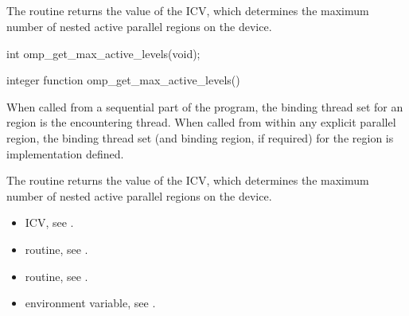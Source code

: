 \subsection{}
\label{subsec:omp_get_max_active_levels}
\summary
The  routine returns the value of the
 ICV, which determines the maximum number of nested active parallel regions
on the device.

\format
\begin{ccppspecific}
\begin{ompcFunction}
int omp_get_max_active_levels(void);
\end{ompcFunction}
\end{ccppspecific}

\begin{fortranspecific}
\begin{ompfFunction}
integer function omp_get_max_active_levels()
\end{ompfFunction}
\end{fortranspecific}

\binding
When called from a sequential part of the program, the binding thread set for an
 region is the encountering thread. When called
from within any explicit parallel region, the binding thread set (and binding region, if
required) for the  region is implementation defined.

\effect
The  routine returns the value of the  ICV,
which determines the maximum number of nested active parallel regions
on the device.

\crossreferences
\begin{itemize}
\item {} ICV, see
.

\item {} routine, see
.

\item {} routine, see
.

\item {} environment variable, see
.
\end{itemize}








